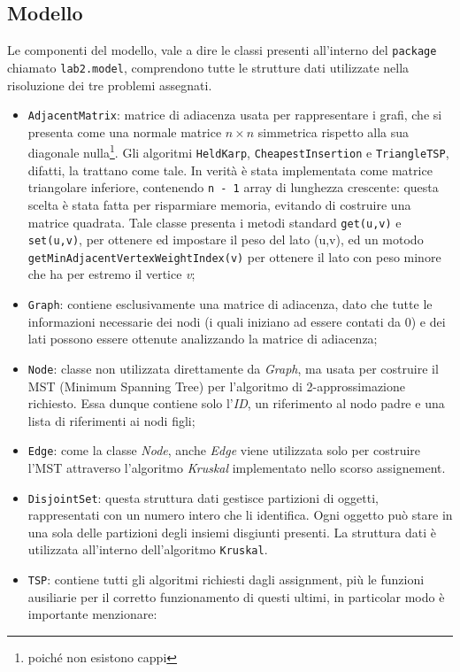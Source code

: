\subsection{Modello}
Le componenti del modello, vale a dire le classi presenti all'interno del \texttt{package} chiamato \texttt{lab2.model}, comprendono tutte le strutture dati utilizzate nella risoluzione dei tre problemi assegnati. 
\begin{itemize}
	\item \texttt{AdjacentMatrix}: matrice di adiacenza usata per rappresentare i grafi, che si presenta come una normale matrice $n\times n$ simmetrica rispetto alla sua diagonale nulla\footnote{poiché non esistono cappi}. Gli algoritmi \texttt{HeldKarp}, \texttt{CheapestInsertion} e \texttt{TriangleTSP}, difatti, la trattano come tale. In verità è stata implementata come matrice triangolare inferiore, contenendo \texttt{n - 1} array di lunghezza crescente: questa scelta è stata fatta per risparmiare memoria, evitando di costruire una matrice quadrata. Tale classe presenta i metodi standard \texttt{get(u,v)} e \texttt{set(u,v)}, per ottenere ed impostare il peso del lato (u,v), ed un motodo \texttt{getMinAdjacentVertexWeightIndex(v)} per ottenere il lato con peso minore che ha per estremo il vertice \textit{v};
	\item \texttt{Graph}: contiene esclusivamente una matrice di adiacenza, dato che tutte le informazioni necessarie dei nodi (i quali iniziano ad essere contati da 0) e dei lati possono essere ottenute analizzando la matrice di adiacenza;
	\item \texttt{Node}: classe non utilizzata direttamente da \textit{Graph}, ma usata per costruire il MST (Minimum Spanning Tree) per l'algoritmo di 2-approssimazione richiesto. Essa dunque contiene solo l'\textit{ID}, un riferimento al nodo padre e una lista di riferimenti ai nodi figli;
	\item \texttt{Edge}: come la classe \textit{Node}, anche \textit{Edge} viene utilizzata solo per costruire l'MST attraverso l'algoritmo \textit{Kruskal} implementato nello scorso assignement.
	\item \texttt{DisjointSet}: questa struttura dati gestisce partizioni di oggetti, rappresentati con un numero intero che li identifica. Ogni oggetto può stare in una sola delle partizioni degli insiemi disgiunti presenti. La struttura dati è utilizzata all'interno dell'algoritmo \texttt{Kruskal}.
	\item \texttt{TSP}: contiene tutti gli algoritmi richiesti dagli assignment, più le funzioni ausiliarie per il corretto funzionamento di questi ultimi, in particolar modo è importante menzionare:

\end{itemize}
